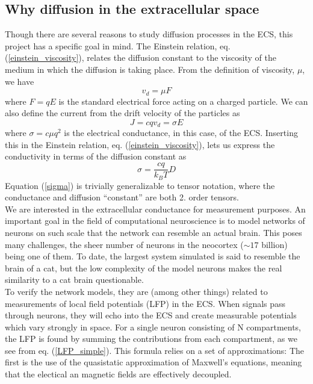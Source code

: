 \documentclass[a4paper,english, 12pt, twoside]{article}
\begin{document}
\subsection{Why diffusion in the extracellular space}
Though there are several reasons to study diffusion processes in the ECS, this project has a specific goal in mind. 
The Einstein relation, eq. (\ref{einstein_viscosity}), relates the diffusion constant to the viscosity of the medium in which the diffusion is taking place. 
From the definition of viscosity, $\mu$, we have 
\begin{equation}
v_d = \mu F 
\end{equation}
where $F = qE$ is the standard electrical force acting on a charged particle. 
We can also define the current from the drift velocity of the particles as 
\begin{equation}
J = cqv_d = \sigma E 
\end{equation}
where $\sigma = c\mu q^2$ is the electrical conductance, in this case, of the ECS. 
Inserting this in the Einstein relation, eq. (\ref{einstein_viscosity}), lets us express the conductivity in terms of the diffusion constant as 
\begin{equation}\label{sigma}
\sigma = \frac{cq}{k_B T}D 
\end{equation}
Equation (\ref{sigma}) is trivially generalizable to tensor notation, where the conductance and diffusion ``constant'' are both 2. order tensors.\\
We are interested in the extracellular conductance for measurement purposes. 
An important goal in the field of computational neuroscience is to model networks of neurons on such scale that the network can resemble an actual brain. 
This poses many challenges, the sheer number of neurons in the neocortex ($\sim 17$ billion) being one of them. 
To date, the largest system simulated is said to resemble the brain of a cat, but the low complexity of the model neurons makes the real similarity to a cat brain questionable. \\
To verify the network models, they are (among other things) related to measurements of local field potentials (LFP) in the ECS. 
When signals pass through neurons, they will echo into the ECS and create measurable potentials which vary strongly in space. 
For a single neuron consisting of N compartments, the LFP is found by summing the contributions from each compartment, as we see from eq. (\ref{LFP_simple}). 
This formula relies on a set of approximations: The first is the use of the quasistatic approximation of Maxwell's equations, meaning that the electical an magnetic fields are effectively decoupled. 
\end{document}
